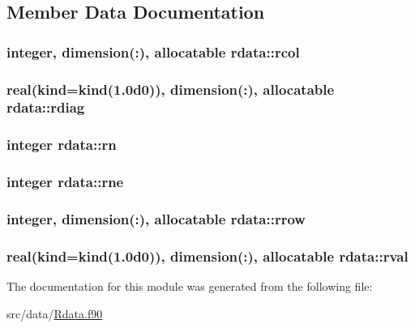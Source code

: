 \subsection{Member Data Documentation}
\hypertarget{classrdata_a293ef50d8603271fa571f705f4d774d4}{
\subsubsection[{rcol}]{\setlength{\rightskip}{0pt plus 5cm}integer, dimension(\-:), allocatable rdata\-::rcol}}\label{classrdata_a293ef50d8603271fa571f705f4d774d4}
\hypertarget{classrdata_a89b639fead94b96b7f5d6aef6a7a449a}{
\subsubsection[{rdiag}]{\setlength{\rightskip}{0pt plus 5cm}real(kind=kind(1.\-0d0)), dimension(\-:), allocatable rdata\-::rdiag}}\label{classrdata_a89b639fead94b96b7f5d6aef6a7a449a}
\hypertarget{classrdata_a9a5360e6be18637e65fcae5c55d8db98}{
\subsubsection[{rn}]{\setlength{\rightskip}{0pt plus 5cm}integer rdata\-::rn}}\label{classrdata_a9a5360e6be18637e65fcae5c55d8db98}
\hypertarget{classrdata_ae2a9f3970d94f6130c3dfd4f3f955768}{
\subsubsection[{rne}]{\setlength{\rightskip}{0pt plus 5cm}integer rdata\-::rne}}\label{classrdata_ae2a9f3970d94f6130c3dfd4f3f955768}
\hypertarget{classrdata_aa0e9818ee0a39f028d35cd48a32e5cba}{
\subsubsection[{rrow}]{\setlength{\rightskip}{0pt plus 5cm}integer, dimension(\-:), allocatable rdata\-::rrow}}\label{classrdata_aa0e9818ee0a39f028d35cd48a32e5cba}
\hypertarget{classrdata_ae49a7ea0826ee25bffa2ed191b07cbb3}{
\subsubsection[{rval}]{\setlength{\rightskip}{0pt plus 5cm}real(kind=kind(1.\-0d0)), dimension(\-:), allocatable rdata\-::rval}}\label{classrdata_ae49a7ea0826ee25bffa2ed191b07cbb3}


The documentation for this module was generated from the following file\-:\begin{DoxyCompactItemize}
\item 
src/data/\hyperlink{_rdata_8f90}{Rdata.\-f90}\end{DoxyCompactItemize}
